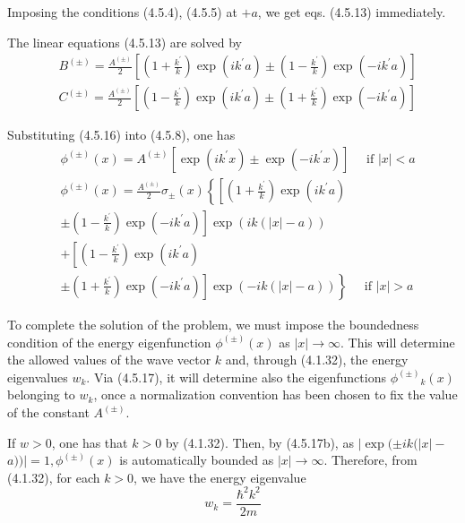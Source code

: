 \documentclass{article}
\begin{document}
Imposing the conditions (4.5.4), (4.5.5) at $+a$, we get eqs. (4.5.13) immediately.

The linear equations (4.5.13) are solved by
$$
\begin{align*}
& B^{( \pm)}=\frac{A^{( \pm)}}{2}\left[\left(1+\frac{k^{\prime}}{k}\right) \exp \left(i k^{\prime} a\right) \pm\left(1-\frac{k^{\prime}}{k}\right) \exp \left(-i k^{\prime} a\right)\right]  \tag{4.5.16a}\\
& C^{( \pm)}=\frac{A^{( \pm)}}{2}\left[\left(1-\frac{k^{\prime}}{k}\right) \exp \left(i k^{\prime} a\right) \pm\left(1+\frac{k^{\prime}}{k}\right) \exp \left(-i k^{\prime} a\right)\right] \tag{4.5.16b}
\end{align*}
$$

Substituting (4.5.16) into (4.5.8), one has
$$
\begin{align*}
& \phi^{( \pm)}(x)=A^{( \pm)}\left[\exp \left(i k^{\prime} x\right) \pm \exp \left(-i k^{\prime} x\right)\right] \quad \text { if }|x|<a  \tag{4.5.17a}\\
& \phi^{( \pm)}(x)=\frac{A^{( \pm)}}{2} \sigma_{ \pm}(x)\left\{\left[\left(1+\frac{k^{\prime}}{k}\right) \exp \left(i k^{\prime} a\right)\right.\right.  \tag{4.5.17b}\\
&\left. \pm\left(1-\frac{k^{\prime}}{k}\right) \exp \left(-i k^{\prime} a\right)\right] \exp (i k(|x|-a)) \\
&+\left[\left(1-\frac{k^{\prime}}{k}\right) \exp \left(i k^{\prime} a\right)\right. \\
&\left.\left. \pm\left(1+\frac{k^{\prime}}{k}\right) \exp \left(-i k^{\prime} a\right)\right] \exp (-i k(|x|-a))\right\} \quad \text { if }|x|>a
\end{align*}
$$

To complete the solution of the problem, we must impose the boundedness condition of the energy eigenfunction $\phi^{( \pm)}(x)$ as $|x| \rightarrow \infty$. This will determine the allowed values of the wave vector $k$ and, through (4.1.32), the energy eigenvalues $w_{k}$. Via (4.5.17), it will determine also the eigenfunctions $\phi^{( \pm)}{ }_{k}(x)$ belonging to $w_{k}$, once a normalization convention has been chosen to fix the value of the constant $A^{( \pm)}$.

If $w>0$, one has that $k>0$ by (4.1.32). Then, by (4.5.17b), as $\mid \exp ( \pm i k(|x|-$ $a)) \mid=1, \phi^{( \pm)}(x)$ is automatically bounded as $|x| \rightarrow \infty$. Therefore, from (4.1.32), for each $k>0$, we have the energy eigenvalue
$$
\begin{equation*}
w_{k}=\frac{\hbar^{2} k^{2}}{2 m} \tag{4.5.18}
\end{equation*}
$$
\end{document}
